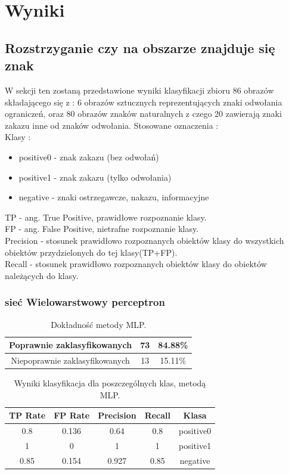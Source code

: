 \documentclass{classrep}
\begin{document}
\section{Wyniki}

\subsection{Rozstrzyganie czy na obszarze znajduje się znak}

W sekcji ten zostaną przedstawione wyniki klasyfikacji zbioru 86 obrazów składającego się z : 6 obrazów sztucznych reprezentujących znaki odwołania ograniczeń, oraz 80 obrazów znaków naturalnych z czego 20 zawierają znaki zakazu inne od znaków odwołania.
Stosowane oznaczenia :\\
Klasy :
\begin{itemize}
\item positive0 - znak zakazu (bez odwołań)
\item positive1 - znak zakazu (tylko odwołania)
\item negative - znaki ostrzegawcze, nakazu, informacyjne
\end{itemize} 
TP - ang. True Positive, prawidłowe rozpoznanie klasy.\\
FP - ang. False Positive, nietrafne rozpoznanie klasy.\\
Precision - stosunek prawidłowo rozpoznanych obiektów klasy do wszystkich obiektów przydzielonych do tej klasy(TP+FP).\\
Recall - stosunek prawidłowo rozpoznanych obiektów klasy do obiektów należących do klasy.


\subsubsection{sieć Wielowarstwowy perceptron}

\begin{table}[H]
\centering
\begin{tabular}{|c|c|c|}
\hline 
Poprawnie zaklasyfikowanych & 73 & 84.88\% \\ 
\hline 
Niepoprawnie zaklasyfikowanych & 13 & 15.11\% \\ 
\hline 
\end{tabular} 
\caption{Dokładność metody MLP.}
\label{wyniki:mlpproc}
\end{table}



\begin{table}[H]
\centering
\begin{tabular}{|c|c|c|c|c|}
\hline 
TP Rate &  FP Rate & Precision &  Recall &  Klasa \\
\hline
0.8    &   0.136   &   0.64  &    0.8  &  positive0 \\
\hline
1      &   0     &     1    &     1   &   positive1 \\
\hline
0.85    &  0.154  &    0.927  &   0.85  & negative \\
\hline 
\end{tabular} 
\caption{Wyniki klasyfikacja dla poszczególnych klas, metodą MLP.}
\label{wyniki:mlpclass}
\end{table}
\end{document}
